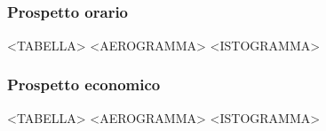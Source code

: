 \subsection{}

\subsubsection{Prospetto orario}

<TABELLA>
<AEROGRAMMA>
<ISTOGRAMMA>

\subsubsection{Prospetto economico}

<TABELLA>
<AEROGRAMMA>
<ISTOGRAMMA>

